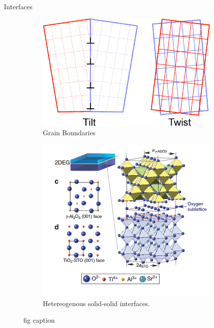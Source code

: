 \documentclass[aspectratio=169]{beamer}
\begin{document}
\begin{frame}{Interfaces}
\begin{figure}
    \centering
    \begin{subfigure}{0.45\textwidth}
        \centering
        \includegraphics[width=\linewidth]{lectures/figures/11_GBs.png}
    \caption{Grain Boundaries}
    \end{subfigure}
    \begin{subfigure}{0.45\textwidth}
        \centering
        \includegraphics[width=\linewidth]{lectures/figures/11_hetero_interfaces.png}
    \caption{Hetereogenous solid-solid interfaces.}
    \end{subfigure}
    \caption{fig caption}
    \label{fig}
\end{figure} 
\end{frame} 
\end{document}
